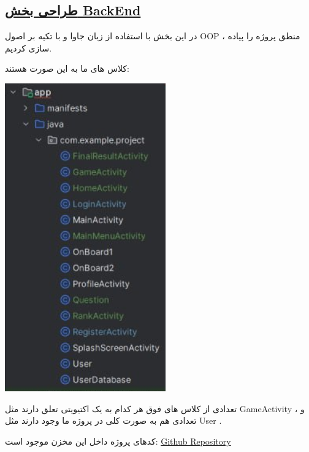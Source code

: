 \subsection*{\underline{طراحی بخش BackEnd}}
در این بخش با استفاده از زبان جاوا و با تکیه بر اصول OOP ، منطق پروژه را پیاده سازی کردیم. 

کلاس های ما به این صورت هستند:

\qquad \qquad \qquad \qquad \qquad  \qquad \qquad \includegraphics[width=0.3\linewidth]{screenshot006}


تعدادی از کلاس های فوق هر کدام به یک اکتیویتی تعلق دارند مثل GameActivity ، و تعدادی هم به صورت کلی در پروژه ما وجود دارند مثل User .


کدهای پروژه داخل این مخزن موجود است:
\href{https://github.com/MelikaAlizadeh/Mobile-Project}{Github Repository}